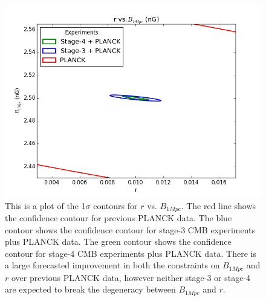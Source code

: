 \begin{figure}[h]
\centering
\includegraphics[scale=0.85]{images/contours/52.png}
\caption{This is a plot of the 1$\sigma$ contours for $r$ vs. $B_{1Mpc}$. The red line shows the confidence contour for previous PLANCK data. The blue contour shows the confidence contour for stage-3 CMB experiments plus PLANCK data. The green contour shows the confidence contour for stage-4 CMB experiments plus PLANCK data. There is a large forecasted improvement in both the constraints on $B_{1Mpc}$ and $r$ over previous PLANCK data, however neither stage-3 or stage-4 are expected to break the degeneracy between $B_{1Mpc}$ and $r$.}
\label{fig:r}
\end{figure}


